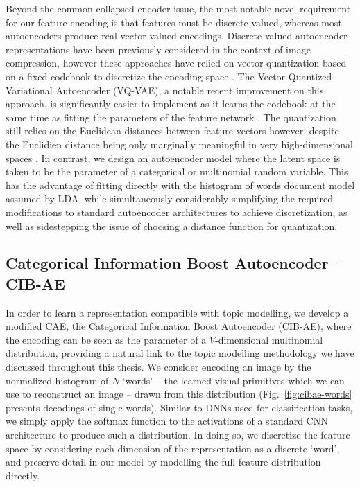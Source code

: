 Beyond the common collapsed encoder issue, the most notable novel requirement for our feature encoding is that features must be discrete-valued, whereas most autoencoders produce real-vector valued encodings. Discrete-valued autoencoder representations have been previously considered in the context of image compression, however these approaches have relied on vector-quantization based on a fixed codebook to discretize the encoding space \citep{AgustssonSoftToHardVQ}. The Vector Quantized Variational Autoencoder (VQ-VAE), a notable recent improvement on this approach, is significantly easier to implement as it learns the codebook at the same time as fitting the parameters of the feature network \citep{vqvae2017}. The quantization still relies on the Euclidean distances between feature vectors however, despite the Euclidien distance being only marginally meaningful in very high-dimensional spaces \citep{aggarwal2001metrics}.
In contrast, we design an autoencoder model where the latent space is taken to be the parameter of a categorical or multinomial random variable. This has the advantage of fitting directly with the histogram of words document model assumed by LDA, while simultaneously considerably simplifying the required modifications to standard autoencoder architectures to achieve discretization, as well as sidestepping the issue of choosing a distance function for quantization.

\subsection{Categorical Information Boost Autoencoder -- CIB-AE}

In order to learn a representation compatible with topic modelling, we develop a modified CAE, the Categorical Information Boost Autoencoder (CIB-AE), where the encoding can be seen as the parameter of a $V$-dimensional multinomial distribution, providing a natural link to the topic modelling methodology we have discussed throughout this thesis. We consider encoding an image by the normalized histogram of $N$ `words' -- the learned visual primitives which we can use to reconstruct an image -- drawn from this distribution (Fig.~\ref{fig:cibae-words} presents decodings of single words). Similar to DNNs used for classification tasks, we simply apply the softmax function to the activations of a standard CNN architecture to produce such a distribution. In doing so, we discretize the feature space by considering each dimension of the representation as a discrete `word', and preserve detail in our model by modelling the full feature distribution directly.

